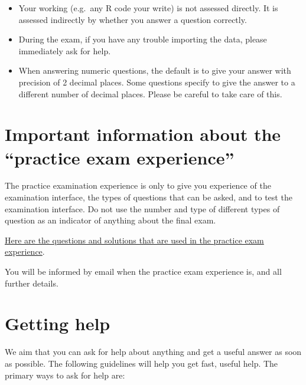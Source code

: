 \documentclass[
  letterpaper,
  8pt,
  a4paper]{book}
\begin{document}
\begin{itemize}
  during the exam, so please ensure that you can do things like
  importing data quickly and easily.
\item
  Your working (e.g.~any R code your write) is not assessed directly. It
  is assessed indirectly by whether you answer a question correctly.
\item
  During the exam, if you have any trouble importing the data, please
  immediately ask for help.
\item
  When answering numeric questions, the default is to give your answer
  with precision of 2 decimal places. Some questions specify to give the
  answer to a different number of decimal places. Please be careful to
  take care of this.
\end{itemize}

\section*{Important information about the ``practice exam
experience''}\label{important-information-about-the-practice-exam-experience}


The practice examination experience is only to give you experience of
the examination interface, the types of questions that can be asked, and
to test the examination interface. Do not use the number and type of
different types of question as an indicator of anything about the final
exam.

\href{https://github.com/opetchey/BIO144/raw/master/2_content/xtras/BIO144_exam_preparation_solutions.pdf}{Here
are the questions and solutions that are used in the practice exam
experience}.

You will be informed by email when the practice exam experience is, and
all further details.

\section*{Getting help}\label{getting-help}


We aim that you can ask for help about anything and get a useful answer
as soon as possible. The following guidelines will help you get fast,
useful help. The primary ways to ask for help are:
\end{document}

